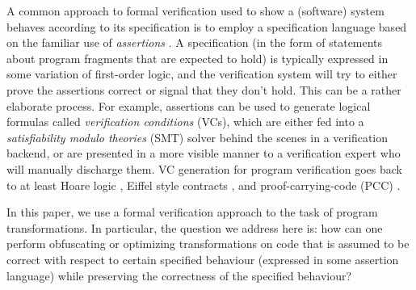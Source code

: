 \documentclass[compsoc,conference,a4paper,10pt,times]{IEEEtran}
\begin{document}
A common approach to formal verification used to show a (software) system behaves according to its specification is to employ a specification language based on the familiar use of \emph{assertions} \cite{Floyd,Hoare}. A specification (in the form of statements about program fragments that are expected to hold) is typically expressed in some variation of first-order logic, and the verification system will try to either prove the assertions correct or signal that they don't hold. This can be a rather elaborate process.  For example, assertions can be used to generate logical formulas called \emph{verification conditions} (VCs), which are either fed into a \emph{satisfiability modulo theories} (SMT) \cite{ge2007solving} solver behind the scenes in a verification backend, or are presented in a more visible manner to a verification expert who will manually discharge them. VC generation for program verification goes back to at least Hoare logic \cite{Hoare}, Eiffel style contracts \cite{Eiffel}, and proof-carrying-code (PCC) \cite{b7}.

In this paper, we use a formal verification approach to the task of program transformations.
In particular, the question we address here is:
how can one perform obfuscating or optimizing transformations on code that is assumed to be correct with respect to certain specified behaviour (expressed in some assertion language) while preserving the correctness of the specified behaviour?
\end{document}
